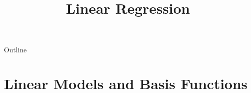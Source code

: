 %

\title[Linear Regression]{Linear Regression}

%

\begin{frame}
  \titlepage
\end{frame}

\begin{frame}{Outline}
  \tableofcontents
\end{frame}

\section{Linear Models and Basis Functions}

